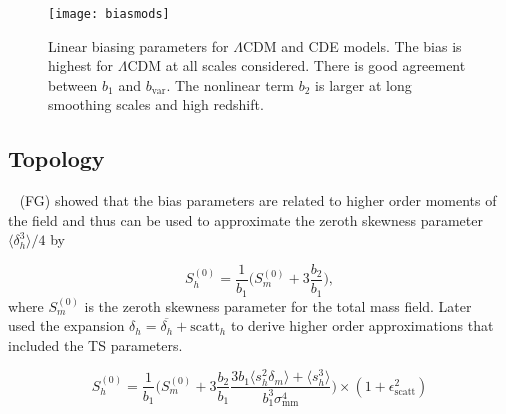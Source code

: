 
\begin{figure}
	\centering
	\texttt{[image: biasmods]}
    \caption{Linear biasing parameters for $\Lambda$CDM and CDE models. The bias is highest for $\Lambda$CDM at all scales considered. There is good agreement between $b_1$ and $b_{\mathrm{var}}$. The nonlinear term $b_2$ is larger at long smoothing scales and high redshift.}
    \label{fig:biasmods}
\end{figure}


\subsection{Topology}



~\citealt*{Fry1993} (FG) showed that the bias parameters are related to higher order moments of the field and thus can be used to approximate the zeroth skewness parameter $\langle \delta_h^3 \rangle / 4$ by

\begin{equation}
S^{(0)}_h = \frac{1}{b_1} \Big( S^{(0)}_m + 3 \frac{b_2}{b_1} \Big), 
\end{equation}
where $S^{(0)}_m$ is the zeroth skewness parameter for the total mass field.
Later ~\citet{Hikage2003} used the expansion $\delta_h = \overline{\delta_h} + \mathrm{scatt}_h$ to derive higher order approximations that included the TS parameters.

\begin{equation}
S^{(0)}_h = \frac{1}{b_1} \Big( S^{(0)}_m + 3 \frac{b_2}{b_1} \frac{ 3 b_1 \langle s_h^2 \delta_m \rangle + \langle s_h^3 \rangle}{b_1^3 \sigma_{\mathrm{mm}}^4} \Big ) \times (1 + \epsilon_{\mathrm{scatt}}^2 )
\end{equation}

